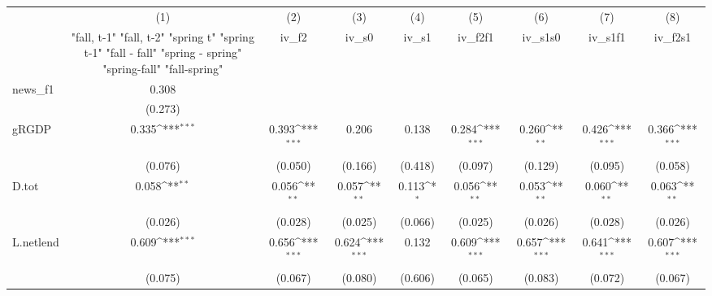 {
\def\sym#1{\ifmmode^{#1}\else\(^{#1}\)\fi}
\begin{tabular}{l*{8}{c}}
\toprule
            &\multicolumn{1}{c}{(1)}&\multicolumn{1}{c}{(2)}&\multicolumn{1}{c}{(3)}&\multicolumn{1}{c}{(4)}&\multicolumn{1}{c}{(5)}&\multicolumn{1}{c}{(6)}&\multicolumn{1}{c}{(7)}&\multicolumn{1}{c}{(8)}\\
            &\multicolumn{1}{c}{  "fall, t-1" "fall, t-2" "spring t" "spring t-1"  "fall - fall" "spring - spring" "spring-fall" "fall-spring" }&\multicolumn{1}{c}{iv\_f2}&\multicolumn{1}{c}{iv\_s0}&\multicolumn{1}{c}{iv\_s1}&\multicolumn{1}{c}{iv\_f2f1}&\multicolumn{1}{c}{iv\_s1s0}&\multicolumn{1}{c}{iv\_s1f1}&\multicolumn{1}{c}{iv\_f2s1}\\
\midrule
news\_f1     &       0.308         &                     &                     &                     &                     &                     &                     &                     \\
            &     (0.273)         &                     &                     &                     &                     &                     &                     &                     \\
\addlinespace
gRGDP       &       0.335\sym{***}&       0.393\sym{***}&       0.206         &       0.138         &       0.284\sym{***}&       0.260\sym{**} &       0.426\sym{***}&       0.366\sym{***}\\
            &     (0.076)         &     (0.050)         &     (0.166)         &     (0.418)         &     (0.097)         &     (0.129)         &     (0.095)         &     (0.058)         \\
\addlinespace
D.tot       &       0.058\sym{**} &       0.056\sym{**} &       0.057\sym{**} &       0.113\sym{*}  &       0.056\sym{**} &       0.053\sym{**} &       0.060\sym{**} &       0.063\sym{**} \\
            &     (0.026)         &     (0.028)         &     (0.025)         &     (0.066)         &     (0.025)         &     (0.026)         &     (0.028)         &     (0.026)         \\
\addlinespace
L.netlend   &       0.609\sym{***}&       0.656\sym{***}&       0.624\sym{***}&       0.132         &       0.609\sym{***}&       0.657\sym{***}&       0.641\sym{***}&       0.607\sym{***}\\
            &     (0.075)         &     (0.067)         &     (0.080)         &     (0.606)         &     (0.065)         &     (0.083)         &     (0.072)         &     (0.067)         \\

\end{tabular}}
